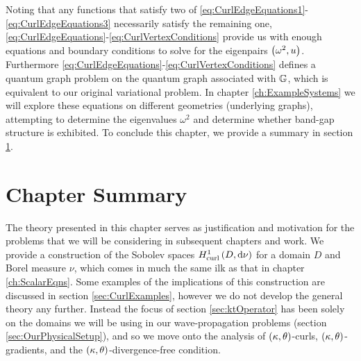 Noting that any functions that satisfy two of \eqref{eq:CurlEdgeEquations1}-\eqref{eq:CurlEdgeEquations3} necessarily satisfy the remaining one, \eqref{eq:CurlEdgeEquations}-\eqref{eq:CurlVertexConditions} provide us with enough equations and boundary conditions to solve for the eigenpairs $\left( \omega^2, u \right)$.
Furthermore \eqref{eq:CurlEdgeEquations}-\eqref{eq:CurlVertexConditions} defines a quantum graph problem on the quantum graph associated with $\mathbb{G}$, which is equivalent to our original variational problem.
In chapter \ref{ch:ExampleSystems} we will explore these equations on different geometries (underlying graphs), attempting to determine the eigenvalues $\omega^2$ and determine whether band-gap structure is exhibited.
To conclude this chapter, we provide a summary in section \ref{sec:CurlSummary}.

\section{Chapter Summary} \label{sec:CurlSummary}
The theory presented in this chapter serves as justification and motivation for the problems that we will be considering in subsequent chapters and work.
We provide a construction of the Sobolev spaces $H^1_\mathrm{curl}\left( D, \mathrm{d}\nu \right)$ for a domain $D$ and Borel measure $\nu$, which comes in much the same ilk as that in chapter \ref{ch:ScalarEqns}.
Some examples of the implications of this construction are discussed in section \ref{sec:CurlExamples}, however we do not develop the general theory any further.
Instead the focus of section \ref{sec:ktOperator} has been solely on the domains we will be using in our wave-propagation problems (section \ref{sec:OurPhysicalSetup}), and so we move onto the analysis of $\left( \kappa, \theta \right)$-curls, $\left( \kappa, \theta \right)$-gradients, and the $\left( \kappa, \theta \right)$-divergence-free condition. \newline

